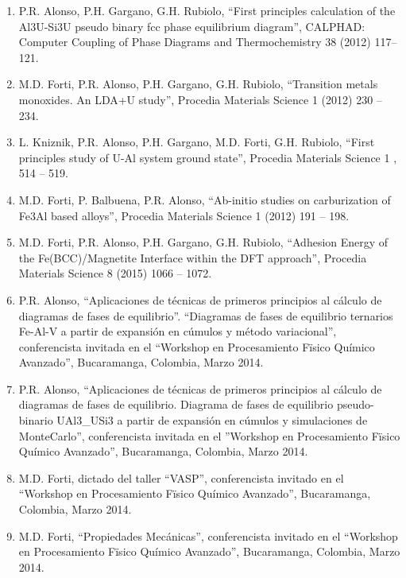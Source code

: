 \begin{enumerate}
\item  P.R. Alonso, P.H. Gargano, G.H. Rubiolo, ``First principles calculation 
of the Al3U-Si3U pseudo binary fcc phase equilibrium diagram'', CALPHAD: Computer 
Coupling of Phase Diagrams and Thermochemistry 38 (2012) 117–121.

\item  M.D. Forti, P.R. Alonso, P.H. Gargano, G.H. Rubiolo, ``Transition 
metals monoxides. An LDA+U study'', Procedia Materials Science 1 (2012) 230 – 234.

\item L. Kniznik, P.R. Alonso, P.H. Gargano, M.D. Forti, G.H. Rubiolo, ``First 
principles study of U-Al system ground state'', Procedia Materials Science 1 , 514 – 519.

\item  M.D. Forti, P. Balbuena, P.R. Alonso, ``Ab-initio studies on 
carburization of Fe3Al based alloys'', Procedia Materials Science 1 (2012) 191 – 
198.

\item  M.D. Forti, P.R. Alonso, P.H. Gargano, G.H. Rubiolo, ``Adhesion Energy 
of the Fe(BCC)/Magnetite Interface within the DFT approach'', Procedia Materials 
Science 8 (2015) 1066 – 1072.

\item  P.R. Alonso, ``Aplicaciones de técnicas de primeros principios al 
cálculo de diagramas de fases de equilibrio''. ``Diagramas de fases de equilibrio 
ternarios Fe-Al-V a partir de expansión en cúmulos y método variacional'', 
conferencista invitada en el ``Workshop en Procesamiento Fïsico Químico 
Avanzado'', Bucaramanga, Colombia, Marzo 2014.

\item  P.R. Alonso, ``Aplicaciones de técnicas de primeros principios al 
cálculo de diagramas de fases de equilibrio. Diagrama de fases de equilibrio 
pseudo-binario UAl3\_USi3 a partir de expansión en cúmulos y simulaciones de 
MonteCarlo'', conferencista invitada en el ''Workshop en Procesamiento Fïsico 
Químico Avanzado'', Bucaramanga, Colombia, Marzo 2014.

\item M.D. Forti, dictado del taller ``VASP'', conferencista invitado en el 
“Workshop en Procesamiento Fïsico Químico Avanzado”, Bucaramanga, Colombia, 
Marzo 2014.

\item  M.D. Forti, ``Propiedades Mecánicas'', conferencista invitado en el 
“Workshop en Procesamiento Fïsico Químico Avanzado”, Bucaramanga, Colombia, 
Marzo 2014.


\end{enumerate}
